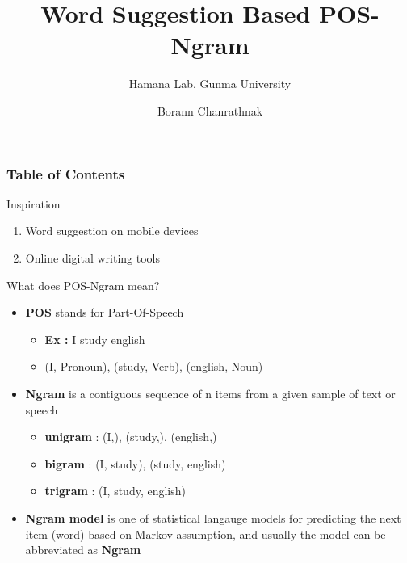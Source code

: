 \documentclass{beamer}
\title{Word Suggestion Based POS-Ngram}
\subtitle{Hamana Lab, Gunma University}
\author{Borann Chanrathnak}
\begin{document}
\maketitle


\begin{frame}
\frametitle{Table of Contents}
\tableofcontents
\end{frame}

\begin{frame}{Inspiration}
\begin{enumerate}
    \item Word suggestion on mobile devices
    \item Online digital writing tools
\end{enumerate}

\end{frame}


\begin{frame}{What does POS-Ngram mean?}
\begin{itemize}
    \item \textbf{POS} stands for Part-Of-Speech
        \begin{itemize}
            \item \textbf{Ex :} I study english
            \item (I, Pronoun), (study, Verb), (english, Noun)
        \end{itemize}
    \item \textbf{Ngram} is a contiguous sequence of n items from a given sample of text or speech
        \begin{itemize}
            \item \textbf{unigram} : (I,), (study,), (english,)
            \item \textbf{bigram} : (I, study), (study, english) 
            \item \textbf{trigram} : (I, study, english)
        \end{itemize}
    \item \textbf{Ngram model} is one of statistical langauge models for predicting the next item (word) based on Markov assumption, and usually the model can be abbreviated as \textbf{Ngram}
\end{itemize}
\end{frame}
\end{document}
